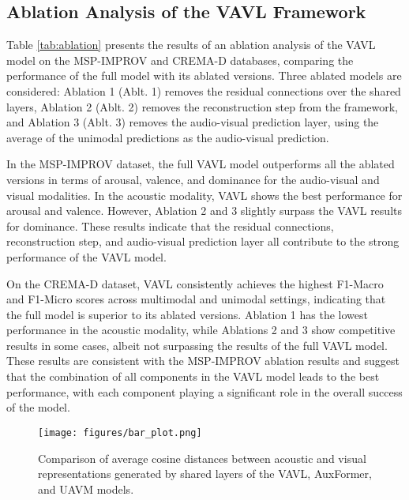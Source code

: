 \documentclass{article}
\begin{document}
\subsection{Ablation Analysis of the VAVL Framework}
\label{ssec:ablations}

Table \ref{tab:ablation} presents the results of an ablation analysis of the VAVL model on the MSP-IMPROV and CREMA-D databases, comparing the performance of the full model with its ablated versions. Three ablated models are considered: Ablation 1 (Ablt. 1) removes the residual connections over the shared layers, Ablation 2 (Ablt. 2) removes the reconstruction step from the framework, and Ablation 3 (Ablt. 3) removes the audio-visual prediction layer, using the average of the unimodal predictions as the audio-visual prediction.

In the MSP-IMPROV dataset, the full VAVL model outperforms all the ablated versions in terms of arousal, valence, and dominance for the audio-visual and visual modalities. In the acoustic modality, VAVL shows the best performance for arousal and valence. However, Ablation 2 and 3 slightly surpass the VAVL results for dominance. These results indicate that the residual connections, reconstruction step, and audio-visual prediction layer all contribute to the strong performance of the VAVL model. 

On the CREMA-D dataset, VAVL consistently achieves the highest F1-Macro and F1-Micro scores across multimodal and unimodal settings, indicating that the full model is superior to its ablated versions. Ablation 1 has the lowest performance in the acoustic modality, while Ablations 2 and 3 show competitive results in some cases, albeit not surpassing the results of the full VAVL model. These results are consistent with the MSP-IMPROV ablation results and suggest that the combination of all components in the VAVL model leads to the best performance, with each component playing a significant role in the overall success of the model.

\begin{figure}[t]
    \centering
    \texttt{[image: figures/bar\_plot.png]}
    \caption{Comparison of average cosine distances between acoustic and visual representations generated by shared layers of the VAVL, AuxFormer, and UAVM models.}
    \label{fig:cosine}
\end{figure}
\end{document}
